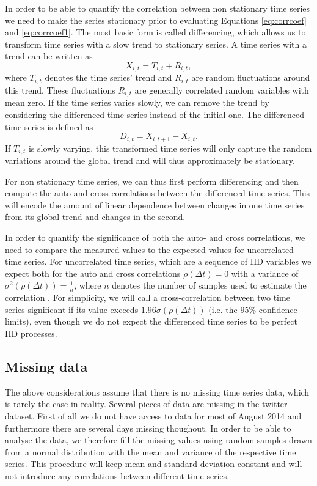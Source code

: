 \documentclass[12pt, a4paper]{article}
\begin{document}
In order to be able to quantify the correlation between non stationary time series we need to make the series stationary prior to evaluating Equations \ref{eq:corrcoef} and \ref{eq:corrcoef1}. The most basic form is called differencing, which allows us to transform time series with a slow trend to stationary series. A time series with a trend can be written as \cite{dettling14}
\begin{equation}
X_{i, t} = T_{i, t} + R_{i, t},
\end{equation} 
where $T_{i, t}$ denotes the time series' trend and $R_{i, t}$ are random fluctuations around this trend. These fluctuations $R_{i, t}$ are generally correlated random variables with mean zero. If the time series varies slowly, we can remove the trend by considering the differenced time series instead of the initial one. The differenced time series is defined as \cite{dettling14}
\begin{equation}
D_{i, t} = X_{i, t+1}- X_{i, t}.
\label{eq:diff}
\end{equation} 
If $T_{i, t}$ is slowly varying, this transformed time series will only capture the random variations around the global trend and will thus approximately be stationary.

For non stationary time series, we can thus first perform differencing and then compute the auto and cross correlations between the differenced time series. This will encode the amount of linear dependence between changes in one time series from its global trend and changes in the second. 

In order to quantify the significance of both the auto- and cross correlations, we need to compare the measured values to the expected values for uncorrelated time series. For uncorrelated time series, which are a sequence of IID variables we expect both for the auto and cross correlations $\rho(\Delta t) = 0$ with a variance of $\sigma^{2}(\rho(\Delta t)) = \frac{1}{n}$, where $n$ denotes the number of samples used to estimate the correlation \cite{dettling14}. For simplicity, we will call a cross-correlation between two time series significant if its value exceeds $1.96 \sigma(\rho(\Delta t))$ (i.e. the $95 \%$ confidence limits), even though we do not expect the differenced time series to be perfect IID processes. 

\subsection{Missing data}\label{sec:missingdata}
The above considerations assume that there is no missing time series data, which is rarely the case in reality. Several pieces of data are missing in the twitter dataset. First of all we do not have access to data for most of August 2014 and furthermore there are several days missing thoughout. In order to be able to analyse the data, we therefore fill the missing values using random samples drawn from a normal distribution with the mean and variance of the respective time series. This procedure will keep mean and standard deviation constant and will not introduce any correlations between different time series.
\end{document}
